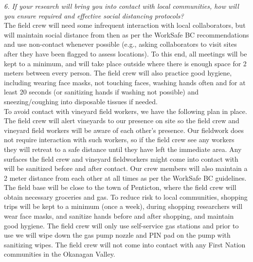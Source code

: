 \documentclass[11pt,letter]{article}
\begin{document}
\emph{6. If your research will bring you into contact with local communities, how will you ensure required and effective social distancing protocols?}\\

The field crew will need some infrequent interaction with local collaborators, but will maintain social distance from then as per the WorkSafe BC recommendations and use non-contact whenever possible (e.g., asking collaborators to visit sites after they have been flagged to assess locations). To this end, all meetings will be kept to a minimum, and will take place outside where there is enough space for 2 meters between every person. The field crew will also practice good hygiene, including wearing face masks, not touching faces, washing hands often and for at least 20 seconds (or sanitizing hands if washing not possible) and sneezing/coughing into disposable tissues if needed. \\

To avoid contact with vineyard field workers, we have the following plan in place. The field crew will alert vineyards to our presence on site so the field crew and vineyard field workers will be aware of each other's presence. Our fieldwork does not require interaction with such workers, so if the field crew see any workers they will retreat to a safe distance until they have left the immediate area. Any surfaces the field crew and vineyard fieldworkers might come into contact with will be sanitized before and after contact. Our crew members will also maintain a 2 meter distance from each other at all times as per the WorkSafe BC guidelines. \\

The field base will be close to the town of Penticton, where the field crew will obtain necessary groceries and gas. To reduce risk to local communities, shopping trips will be kept to a minimum (once a week), during shopping researchers will wear face masks, and sanitize hands before and after shopping, and maintain good hygiene. The field crew will only use self-service gas stations and prior to use we will wipe down the gas pump nozzle and PIN pad on the pump with sanitizing wipes. The field crew will not come into contact with any First Nation communities in the Okanagan Valley.\\ 
\end{document}
